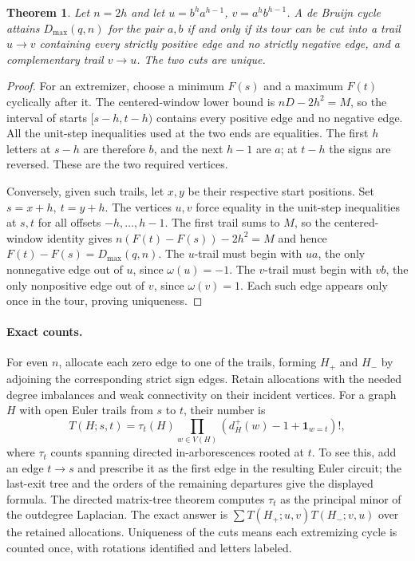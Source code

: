 \documentclass[11pt]{article}
\newtheorem{theorem}{Theorem}
\begin{document}
\begin{theorem}
Let \(n=2h\) and let \(u=b^ha^{h-1}\), \(v=a^hb^{h-1}\).
A de Bruijn cycle attains \(D_{\max}(q,n)\) for the pair \(a,b\)
if and only if its tour can be cut into a trail \(u\to v\)
containing every strictly positive edge and no strictly
negative edge, and a complementary trail \(v\to u\).
The two cuts are unique.
\end{theorem}
\begin{proof}
For an extremizer, choose a minimum \(F(s)\) and a maximum
\(F(t)\) cyclically after it. The centered-window lower bound
is \(nD-2h^2=M\), so the interval of starts \([s-h,t-h)\)
contains every positive edge and no negative edge. All the
unit-step inequalities used at the two ends are equalities.
The first \(h\) letters at \(s-h\) are therefore \(b\), and the
next \(h-1\) are \(a\); at \(t-h\) the signs are reversed.
These are the two required vertices.

Conversely, given such trails, let \(x,y\) be their respective
start positions. Set \(s=x+h,\ t=y+h\). The vertices \(u,v\)
force equality in the unit-step inequalities at \(s,t\) for
all offsets \(-h,\ldots,h-1\). The first trail sums to \(M\),
so the centered-window identity gives
\(n(F(t)-F(s))-2h^2=M\) and hence \(F(t)-F(s)=D_{\max}(q,n)\).
The \(u\)-trail must begin with \(ua\), the only nonnegative
edge out of \(u\), since \(\omega(u)=-1\). The \(v\)-trail
must begin with \(vb\), the only nonpositive edge out of \(v\),
since \(\omega(v)=1\). Each such edge appears only once in the
tour, proving uniqueness.
\end{proof}

\paragraph{Exact counts.}
For even \(n\), allocate each zero edge to one of the trails,
forming \(H_+\) and \(H_-\) by adjoining the corresponding
strict sign edges. Retain allocations with the needed degree
imbalances and weak connectivity on their incident vertices.
For a graph \(H\) with open Euler trails from \(s\) to \(t\),
their number is
\[
 T(H;s,t)=\tau_t(H)
 \prod_{w\in V(H)}(d^+_H(w)-1+\mathbf 1_{w=t})!,
\]
where \(\tau_t\) counts spanning directed in-arborescences
rooted at \(t\). To see this, add an edge \(t\to s\)
and prescribe it as the first edge in the resulting Euler
circuit; the last-exit tree and the orders of the remaining
departures give the displayed formula. The directed
matrix-tree theorem computes \(\tau_t\) as the principal
minor of the outdegree Laplacian. The exact answer is
\(\sum T(H_+;u,v)T(H_-;v,u)\) over the retained allocations.
Uniqueness of the cuts means each extremizing cycle is counted
once, with rotations identified and letters labeled.
\end{document}
